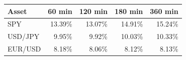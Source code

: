 \begin{tabular}{lrrrr}
\toprule
Asset & 60 min & 120 min & 180 min & 360 min \\
\midrule
SPY & 13.39\% & 13.07\% & 14.91\% & 15.24\% \\
USD/JPY & 9.95\% & 9.92\% & 10.03\% & 10.33\% \\
EUR/USD & 8.18\% & 8.06\% & 8.12\% & 8.13\% \\
\bottomrule
\end{tabular}
